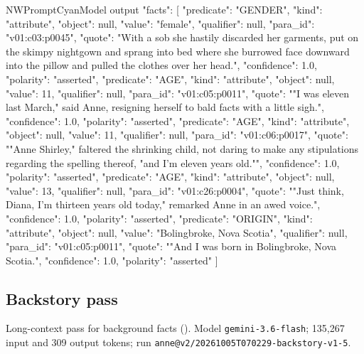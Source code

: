 \begin{nwprompt}{NWPromptCyan}{Model output}
{"facts": [
  {"predicate": "GENDER", "kind": "attribute", "object": null, "value": "female", "qualifier": null, "para_id": "v01:c03:p0045", "quote": "With a sob she hastily discarded her garments, put on the skimpy nightgown and sprang into bed where she burrowed face downward into the pillow and pulled the clothes over her head.", "confidence": 1.0, "polarity": "asserted"},
  {"predicate": "AGE", "kind": "attribute", "object": null, "value": 11, "qualifier": null, "para_id": "v01:c05:p0011", "quote": ""I was eleven last March," said Anne, resigning herself to bald facts with a little sigh.", "confidence": 1.0, "polarity": "asserted"},
  {"predicate": "AGE", "kind": "attribute", "object": null, "value": 11, "qualifier": null, "para_id": "v01:c06:p0017", "quote": ""Anne Shirley," faltered the shrinking child, not daring to make any stipulations regarding the spelling thereof, "and I'm eleven years old."", "confidence": 1.0, "polarity": "asserted"},
  {"predicate": "AGE", "kind": "attribute", "object": null, "value": 13, "qualifier": null, "para_id": "v01:c26:p0004", "quote": ""Just think, Diana, I'm thirteen years old today," remarked Anne in an awed voice.", "confidence": 1.0, "polarity": "asserted"},
  {"predicate": "ORIGIN", "kind": "attribute", "object": null, "value": "Bolingbroke, Nova Scotia", "qualifier": null, "para_id": "v01:c05:p0011", "quote": ""And I was born in Bolingbroke, Nova Scotia.", "confidence": 1.0, "polarity": "asserted"}
]}
\end{nwprompt}

\subsection*{Backstory pass}
Long-context pass for background facts (\sys). Model \texttt{gemini-3.6-flash}; 135,267 input and 309 output tokens; run \nolinkurl{anne@v2/20261005T070229-backstory-v1-5}.

